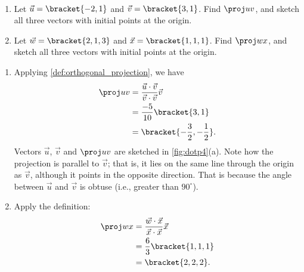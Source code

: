 \begin{example}\label{ex_dotp4}%
\mbox{}\\[-2\baselineskip]\parbox[t]{\linewidth}{%
\begin{enumerate}
	\item Let $\vec u=\bracket{-2,1}$ and $\vec v=\bracket{3,1}$. Find $\proj uv$, and sketch all three vectors with initial points at the origin.
	\item	Let $\vec w =\bracket{2,1,3}$ and $\vec x =\bracket{1,1,1}$. Find $\proj wx$, and sketch all three vectors with initial points at the origin.
\end{enumerate}}\vspace{0pt}
\solution
\begin{enumerate}
	\item Applying \autoref{def:orthogonal_projection}, we have
	\begin{align*}
		\proj uv
		&= \frac{\vec u\cdot\vec v}{\vec v\cdot\vec v}\vec v \\
		&= \frac{-5}{10}\bracket{3,1}\\
		&=\bracket{-\frac32,-\frac12}.
	\end{align*}
	Vectors $\vec u$, $\vec v$ and $\proj uv$ are sketched in \autoref{fig:dotp4}(a). Note how the projection is parallel to $\vec v$; that is, it lies on the same line through the origin as $\vec v$, although it points in the opposite direction. That is because the angle between $\vec u$ and $\vec v$ is obtuse (i.e., greater than $90^\circ$).
	
	\item	Apply the definition:
	\begin{align*}
		\proj wx
		&= \frac{\vec w\cdot\vec x}{\vec x\cdot\vec x}\vec x \\
		&= \frac{6}{3}\bracket{1,1,1}\\
		&=\bracket{2,2,2}.
	\end{align*}
	\iftoggle{in_threeD}{%
	 These vectors are sketched in \autoref{fig:dotp4}(b).%
	}{%
	 These vectors are sketched in \autoref{fig:dotp4}(b), and again in part (c) from a different perspective. Because of the nature of graphing these vectors, the sketch in part (b) makes it difficult  to recognize that the drawn projection has the geometric properties it should. The graph shown in part (c) illustrates these properties better.
	}
\end{enumerate}%
\end{example}

